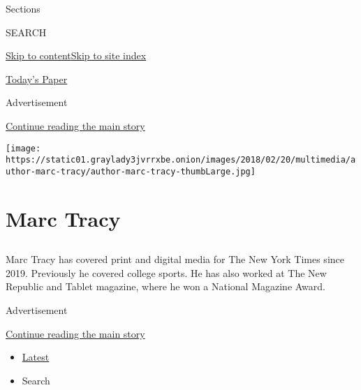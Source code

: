 Sections

SEARCH

\protect\hyperlink{site-content}{Skip to
content}\protect\hyperlink{site-index}{Skip to site index}

\href{https://myaccount.nytimes3xbfgragh.onion/auth/login?response_type=cookie\&client_id=vi}{}

\href{https://www.nytimes3xbfgragh.onion/section/todayspaper}{Today's
Paper}

Advertisement

\protect\hyperlink{after-top}{Continue reading the main story}

\texttt{[image: https://static01.graylady3jvrrxbe.onion/images/2018/02/20/multimedia/author-marc-tracy/author-marc-tracy-thumbLarge.jpg]}

\hypertarget{marc-tracy}{%
\section{Marc Tracy}\label{marc-tracy}}

\subsection{}

Marc Tracy has covered print and digital media for The New York Times
since 2019. Previously he covered college sports. He has also worked at
The New Republic and Tablet magazine, where he won a National Magazine
Award.~

Advertisement

\protect\hyperlink{after-mid1}{Continue reading the main story}

\begin{itemize}
\tightlist
\item
  \protect\hyperlink{stream-panel}{Latest}
\item
  Search
\end{itemize}

